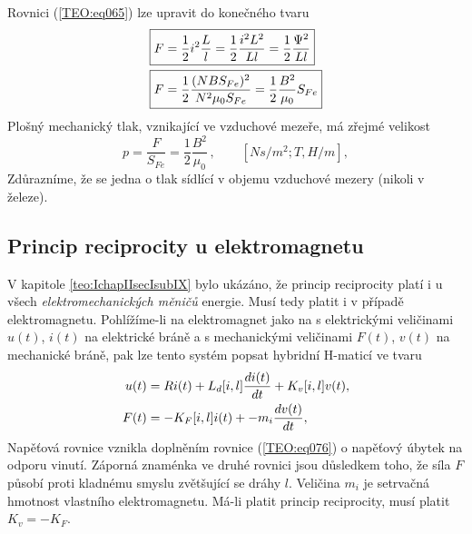       Rovnici (\ref{TEO:eq065}) lze upravit do konečného tvaru
      \begin{subequations}
        \begin{align}  %
           \Aboxed{F &= \frac{1}{2}i^2\frac{L}{l}    
                      = \frac{1}{2}\frac{i^2L^2}{Ll}
                      = \frac{1}{2}\frac{\Psi^2}{Ll}}                     \label{TEO:eq069a} \\
           \Aboxed{F &= \frac{1}{2}\frac{(NBS_{Fe})^2}{N^2\mu_0S_{Fe}}
                      = \frac{1}{2}\frac{B^2}{\mu_0}S_{Fe}}               \label{TEO:eq069b}
        \end{align}
      \end{subequations}
      Plošný mechanický tlak, vznikající ve vzduchové mezeře, má zřejmé velikost 
      \begin{equation}\label{TEO:eq068}
        \boxed{p = \frac{F}{S_{Fe}} = \frac{1}{2}\frac{B^2}{\mu_0}}\,, \qquad [Ns/m^2; T, H/m],
      \end{equation}
      Zdůrazníme, že se jedna o tlak sídlící v objemu vzduchové mezery (nikoli v železe).
      
    \subsection{Princip reciprocity u elektromagnetu}
      V kapitole \ref{teo:IchapIIsecIsubIX} bylo ukázáno, že princip reciprocity platí i u všech 
      \emph{elektromechanických měničů} energie. Musí tedy platit i v případě elektromagnetu. 
      Pohlížíme-li na elektromagnet jako na  s elektrickými veličinami 
      \(u(t)\), \(i(t)\) na elektrické bráně a s mechanickými veličinami \(F(t)\), \(v(t)\) na 
      mechanické bráně, pak lze tento systém popsat hybridní H-maticí ve tvaru
      \begin{subequations}
      \label{TEO:eq075}
        \begin{align}
          u(t) &= Ri(t) + L_d[i,l]\dfrac{d i(t)}{d t} + K_v[i,l]v(t),  \label{TEO:eq075a} \\
          F(t) &= - K_F[i,l]i(t) + -m_i\dfrac{d v(t)}{d t},            \label{TEO:eq075b} 
        \end{align}
      \end{subequations}
      Napěťová rovnice vznikla doplněním rovnice (\ref{TEO:eq076}) o napěťový úbytek na odporu 
      vinutí. Záporná znaménka ve druhé rovnici jsou důsledkem toho, že síla \(F\) působí proti 
      kladnému smyslu zvětšující se dráhy \(l\). Veličina \(m_i\) je setrvačná hmotnost vlastního 
      elektromagnetu. Má-li platit princip reciprocity, musí platit \(K_v = - K_F\).
      
